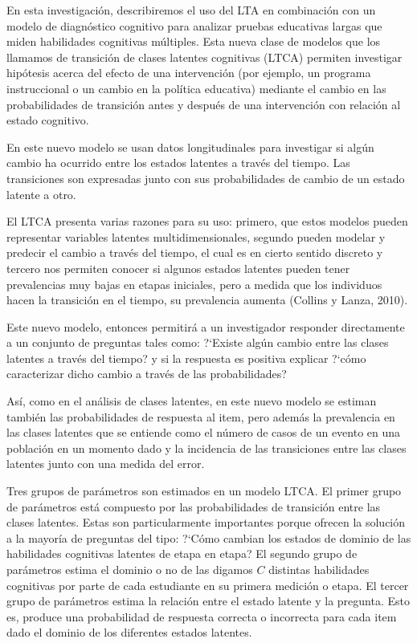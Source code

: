 		En esta investigaci\'{o}n, describiremos el uso del LTA en combinaci\'{o}n con un modelo de diagn\'{o}stico cognitivo para analizar pruebas educativas largas que miden habilidades cognitivas m\'{u}ltiples. Esta nueva clase de modelos  que los llamamos de transici\'{o}n de clases latentes cognitivas (LTCA) permiten investigar hip\'{o}tesis acerca del efecto de una intervenci\'{o}n (por ejemplo, un programa instruccional o un cambio en la pol\'{i}tica educativa) mediante el cambio en las probabilidades de transici\'{o}n antes y despu\'{e}s de una intervenci\'{o}n con relaci\'{o}n al estado cognitivo.
		
		En este nuevo modelo se usan datos longitudinales para investigar si alg\'{u}n cambio ha ocurrido entre los estados latentes a trav\'{e}s del tiempo. Las transiciones son expresadas junto con sus probabilidades de cambio de un estado latente a otro. 
		
		El LTCA presenta varias razones para su uso: primero, que estos modelos pueden representar variables latentes multidimensionales, segundo pueden modelar y predecir el cambio a trav\'{e}s del tiempo, el cual es en cierto sentido discreto y tercero nos permiten conocer si algunos estados latentes pueden tener prevalencias muy bajas en etapas iniciales, pero a medida que los individuos hacen la transici\'{o}n en el tiempo, su prevalencia aumenta (Collins y Lanza, 2010). 
		
		Este nuevo modelo, entonces permitir\'{a} a un investigador responder directamente a un conjunto de preguntas tales como: ?`Existe alg\'{u}n cambio entre las clases latentes a trav\'{e}s del tiempo? y si la respuesta es positiva explicar ?`c\'{o}mo caracterizar dicho cambio a trav\'{e}s de las probabilidades?
		
		As\'{i}, como en el an\'{a}lisis de clases latentes, en este nuevo modelo se estiman tambi\'{e}n las probabilidades de respuesta al item, pero adem\'{a}s la prevalencia en las clases latentes que se entiende como el n\'{u}mero de casos de un evento en una poblaci\'{o}n en un momento dado y la incidencia de las transiciones entre las clases latentes junto con una medida del error.   
		
		Tres grupos de par\'{a}metros son estimados en un modelo LTCA. El primer grupo de par\'{a}metros est\'{a} compuesto por las probabilidades de transici\'{o}n entre las clases latentes. Estas son particularmente importantes porque ofrecen la soluci\'{o}n a la mayor\'{i}a de preguntas del tipo: ?`C\'{o}mo cambian los estados de dominio de las habilidades cognitivas latentes de etapa en etapa? El segundo grupo de par\'{a}metros estima el dominio o no de las digamos $C$ distintas habilidades cognitivas por parte de cada estudiante en su primera medici\'{o}n o etapa. El tercer grupo de par\'{a}metros estima la relaci\'{o}n entre el estado latente y la pregunta. Esto es, produce una probabilidad de respuesta correcta o incorrecta para cada item dado el dominio de los diferentes estados latentes.
		
